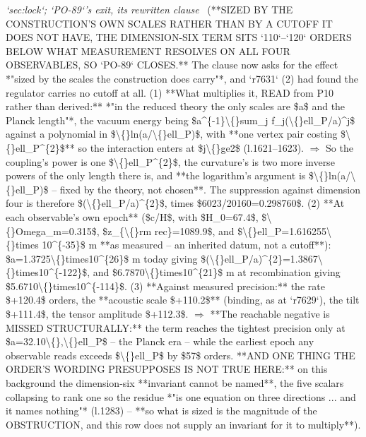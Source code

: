 \begin{description}
\textit{`sec:lock`; `PO-89`'s exit, its rewritten clause} \ (**SIZED BY THE CONSTRUCTION'S OWN SCALES RATHER THAN BY A CUTOFF IT DOES NOT HAVE, THE DIMENSION-SIX TERM SITS `110`--`120` ORDERS BELOW WHAT MEASUREMENT RESOLVES ON ALL FOUR OBSERVABLES, SO `PO-89` CLOSES.** The clause now asks for the effect *"sized by the scales the construction does carry"*, and `r7631` (2) had found the regulator carries no cutoff at all. (1) **What multiplies it, READ from P10 rather than derived:** *"in the reduced theory the only scales are \$a\$ and the Planck length"*, the vacuum energy being \$a\textasciicircum{}\{-1\}\textbackslash\{\}sum\_j f\_j(\textbackslash\{\}ell\_P/a)\textasciicircum{}j\$ against a polynomial in \$\textbackslash\{\}ln(a/\textbackslash\{\}ell\_P)\$, with **one vertex pair costing \$\textbackslash\{\}ell\_P\textasciicircum{}\{2\}\$** so the interaction enters at \$j\textbackslash\{\}ge2\$ (l.1621--1623). \ensuremath{\Rightarrow} So the coupling's power is one \$\textbackslash\{\}ell\_P\textasciicircum{}\{2\}\$, the curvature's is two more inverse powers of the only length there is, and **the logarithm's argument is \$\textbackslash\{\}ln(a/\textbackslash\{\}ell\_P)\$ -- fixed by the theory, not chosen**. The suppression against dimension four is therefore \$(\textbackslash\{\}ell\_P/a)\textasciicircum{}\{2\}\$, times \$6023/20160=0.298760\$. (2) **At each observable's own epoch** (\$c/H\$, with \$H\_0=67.4\$, \$\textbackslash\{\}Omega\_m=0.315\$, \$z\_\{\textbackslash\{\}rm rec\}=1089.9\$, and \$\textbackslash\{\}ell\_P=1.616255\textbackslash\{\}times 10\textasciicircum{}\{-35\}\$ m **as measured -- an inherited datum, not a cutoff**): \$a=1.3725\textbackslash\{\}times10\textasciicircum{}\{26\}\$ m today giving \$(\textbackslash\{\}ell\_P/a)\textasciicircum{}\{2\}=1.3867\textbackslash\{\}times10\textasciicircum{}\{-122\}\$, and \$6.7870\textbackslash\{\}times10\textasciicircum{}\{21\}\$ m at recombination giving \$5.6710\textbackslash\{\}times10\textasciicircum{}\{-114\}\$. (3) **Against measured precision:** the rate \$+120.4\$ orders, the **acoustic scale \$+110.2\$** (binding, as at `r7629`), the tilt \$+111.4\$, the tensor amplitude \$+112.3\$. \ensuremath{\Rightarrow}  **The reachable negative is MISSED STRUCTURALLY:** the term reaches the tightest precision only at \$a=32.10\textbackslash\{\},\textbackslash\{\}ell\_P\$ -- the Planck era -- while the earliest epoch any observable reads exceeds \$\textbackslash\{\}ell\_P\$ by \$57\$ orders.  **AND ONE THING THE ORDER'S WORDING PRESUPPOSES IS NOT TRUE HERE:** on this background the dimension-six **invariant cannot be named**, the five scalars collapsing to rank one so the residue *"is one equation on three directions ... and it names nothing"* (l.1283) -- **so what is sized is the magnitude of the OBSTRUCTION, and this row does not supply an invariant for it to multiply**). 

\end{description}
